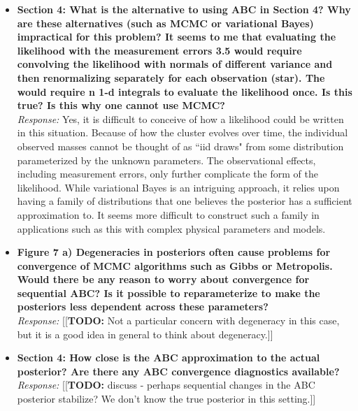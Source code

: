 \documentclass[11pt, oneside]{article}   	%
\newcommand{\todo}[1]{{\color{red}[[\textbf{TODO: }#1]]}}
\begin{document}
\begin{itemize}
\item  {\bf Section 4: What is the alternative to using ABC in Section 4? Why are these alternatives (such as MCMC or variational Bayes) impractical for this problem? It seems to me that evaluating the likelihood with the measurement errors 3.5 would require convolving the likelihood with normals of different variance and then renormalizing separately for each observation (star). The would require n 1-d integrals to evaluate the likelihood once. Is this true? Is this why one cannot use MCMC?}\\
\noindent \emph{Response:} Yes, it is difficult to conceive of how a likelihood could be written in this situation. Because of how the
cluster evolves over time, the individual observed masses cannot
be thought of as ``iid draws" from some distribution parameterized by the unknown parameters. The observational effects, including measurement
errors, only further complicate the form of the likelihood. While variational Bayes is an intriguing approach, it relies upon having a family
of distributions that one believes the posterior has a sufficient approximation to. It seems more difficult to construct such a family in
applications such as this with complex physical parameters and models.

\bigskip

\item  {\bf Figure 7 a) Degeneracies in posteriors often cause problems for convergence of MCMC algorithms such as Gibbs or Metropolis. Would there be any reason to worry about convergence for sequential ABC? Is it possible to reparameterize to make the posteriors less dependent across these parameters?} \\
\noindent \emph{Response:} \todo{Not a particular concern with degeneracy in this case, but it is a good idea in general to think
about degeneracy.}
\bigskip

\item  {\bf  Section 4: How close is the ABC approximation to the actual posterior? Are there any ABC convergence diagnostics available?} \\
\noindent \emph{Response:} \todo{discuss - perhaps sequential changes in the ABC posterior stabilize?  We don't know the true posterior in this setting.}
\bigskip
\end{itemize}


\\
\end{document}
